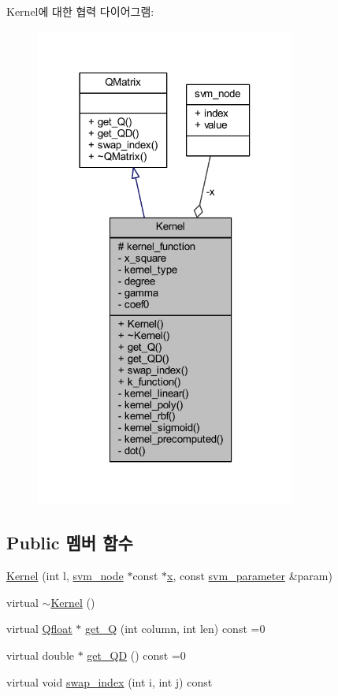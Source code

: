 Kernel에 대한 협력 다이어그램\+:
\nopagebreak
\begin{figure}[H]
\begin{center}
\leavevmode
\includegraphics[width=242pt]{class_kernel__coll__graph}
\end{center}
\end{figure}
\subsection*{Public 멤버 함수}
\begin{DoxyCompactItemize}
\item 
\hyperlink{class_kernel_a25ffaa0c67cc5b8c7fcdb6f97ca1725f}{Kernel} (int l, \hyperlink{structsvm__node}{svm\+\_\+node} $\ast$const $\ast$\hyperlink{class_kernel_a725a35660c4309605c2628fa8290ce5f}{x}, const \hyperlink{structsvm__parameter}{svm\+\_\+parameter} \&param)
\item 
virtual \hyperlink{class_kernel_a9c7407e3a0b1cb9b2f96e9a030187064}{$\sim$\+Kernel} ()
\item 
virtual \hyperlink{svm_8cpp_a8755d90a54ecfb8d15051af3e0542592}{Qfloat} $\ast$ \hyperlink{class_kernel_a30483355cbb8b5ab4e4c7a93bcef7429}{get\+\_\+\+Q} (int column, int len) const =0
\item 
virtual double $\ast$ \hyperlink{class_kernel_a5b7fde9af9d10f7b8f7105eb85bf3d5b}{get\+\_\+\+Q\+D} () const =0
\item 
virtual void \hyperlink{class_kernel_adca807c5584bc42fd098cd9eb1f19621}{swap\+\_\+index} (int i, int j) const 
\end{DoxyCompactItemize}
